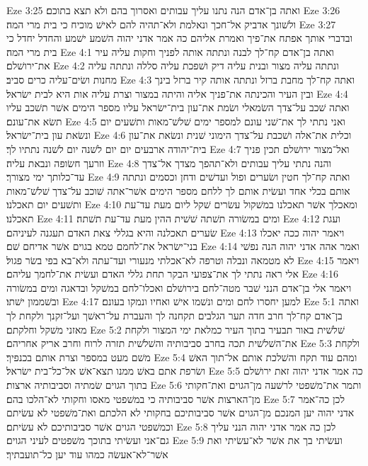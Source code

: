 Eze 3:25  ואתה בן־אדם הנה נתנו עליך עבותים ואסרוך בהם ולא תצא בתוכם׃
Eze 3:26  ולשׁונך אדביק אל־חכך ונאלמת ולא־תהיה להם לאישׁ מוכיח כי בית מרי המה׃
Eze 3:27  ובדברי אותך אפתח את־פיך ואמרת אליהם כה אמר אדני יהוה השׁמע ישׁמע והחדל יחדל כי בית מרי המה׃
Eze 4:1  ואתה בן־אדם קח־לך לבנה ונתתה אותה לפניך וחקות עליה עיר את־ירושׁלם׃
Eze 4:2  ונתתה עליה מצור ובנית עליה דיק ושׁפכת עליה סללה ונתתה עליה מחנות ושׂים־עליה כרים סביב׃
Eze 4:3  ואתה קח־לך מחבת ברזל ונתתה אותה קיר ברזל בינך ובין העיר והכינתה את־פניך אליה והיתה במצור וצרת עליה אות היא לבית ישׂראל׃
Eze 4:4  ואתה שׁכב על־צדך השׂמאלי ושׂמת את־עון בית־ישׂראל עליו מספר הימים אשׁר תשׁכב עליו תשׂא את־עונם׃
Eze 4:5  ואני נתתי לך את־שׁני עונם למספר ימים שׁלשׁ־מאות ותשׁעים יום ונשׂאת עון בית־ישׂראל׃
Eze 4:6  וכלית את־אלה ושׁכבת על־צדך הימוני שׁנית ונשׂאת את־עון בית־יהודה ארבעים יום יום לשׁנה יום לשׁנה נתתיו לך׃
Eze 4:7  ואל־מצור ירושׁלם תכין פניך וזרעך חשׂופה ונבאת עליה׃
Eze 4:8  והנה נתתי עליך עבותים ולא־תהפך מצדך אל־צדך עד־כלותך ימי מצורך׃
Eze 4:9  ואתה קח־לך חטין ושׂערים ופול ועדשׁים ודחן וכסמים ונתתה אותם בכלי אחד ועשׂית אותם לך ללחם מספר הימים אשׁר־אתה שׁוכב על־צדך שׁלשׁ־מאות ותשׁעים יום תאכלנו׃
Eze 4:10  ומאכלך אשׁר תאכלנו במשׁקול עשׂרים שׁקל ליום מעת עד־עת תאכלנו׃
Eze 4:11  ומים במשׂורה תשׁתה שׁשׁית ההין מעת עד־עת תשׁתה׃
Eze 4:12  ועגת שׂערים תאכלנה והיא בגללי צאת האדם תעגנה לעיניהם׃
Eze 4:13  ויאמר יהוה ככה יאכלו בני־ישׂראל את־לחמם טמא בגוים אשׁר אדיחם שׁם׃
Eze 4:14  ואמר אהה אדני יהוה הנה נפשׁי לא מטמאה ונבלה וטרפה לא־אכלתי מנעורי ועד־עתה ולא־בא בפי בשׂר פגול׃
Eze 4:15  ויאמר אלי ראה נתתי לך את־צפועי הבקר תחת גללי האדם ועשׂית את־לחמך עליהם׃
Eze 4:16  ויאמר אלי בן־אדם הנני שׁבר מטה־לחם בירושׁלם ואכלו־לחם במשׁקל ובדאגה ומים במשׂורה ובשׁממון ישׁתו׃
Eze 4:17  למען יחסרו לחם ומים ונשׁמו אישׁ ואחיו ונמקו בעונם׃
Eze 5:1  ואתה בן־אדם קח־לך חרב חדה תער הגלבים תקחנה לך והעברת על־ראשׁך ועל־זקנך ולקחת לך מאזני משׁקל וחלקתם׃
Eze 5:2  שׁלשׁית באור תבעיר בתוך העיר כמלאת ימי המצור ולקחת את־השׁלשׁית תכה בחרב סביבותיה והשׁלשׁית תזרה לרוח וחרב אריק אחריהם׃
Eze 5:3  ולקחת משׁם מעט במספר וצרת אותם בכנפיך׃
Eze 5:4  ומהם עוד תקח והשׁלכת אותם אל־תוך האשׁ ושׂרפת אתם באשׁ ממנו תצא־אשׁ אל־כל־בית ישׂראל׃
Eze 5:5  כה אמר אדני יהוה זאת ירושׁלם בתוך הגוים שׂמתיה וסביבותיה ארצות׃
Eze 5:6  ותמר את־משׁפטי לרשׁעה מן־הגוים ואת־חקותי מן־הארצות אשׁר סביבותיה כי במשׁפטי מאסו וחקותי לא־הלכו בהם׃
Eze 5:7  לכן כה־אמר אדני יהוה יען המנכם מן־הגוים אשׁר סביבותיכם בחקותי לא הלכתם ואת־משׁפטי לא עשׂיתם וכמשׁפטי הגוים אשׁר סביבותיכם לא עשׂיתם׃
Eze 5:8  לכן כה אמר אדני יהוה הנני עליך גם־אני ועשׂיתי בתוכך משׁפטים לעיני הגוים׃
Eze 5:9  ועשׂיתי בך את אשׁר לא־עשׂיתי ואת אשׁר־לא־אעשׂה כמהו עוד יען כל־תועבתיך׃
